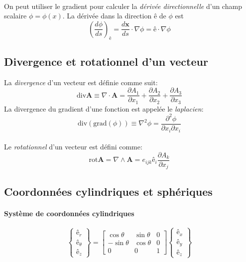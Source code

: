 \paragraph{}
On peut utiliser le gradient pour calculer la \emph{dérivée directionnelle} d'un champ scalaire $\phi=\phi(x)$. La dérivée dans la direction $\textbf{ê}$ de $\phi$ est $$\left(\frac{d\phi}{ds}\right)_{\textbf{ê}}=\frac{d\textbf{x}}{ds}\cdot\nabla\phi=\textbf{ê}\cdot\nabla\phi$$ 

\subsection{Divergence et rotationnel d'un vecteur}
La \emph{divergence} d'un vecteur est définie comme suit: $$\text{div}\textbf{A}\equiv \nabla\cdot\textbf{A}=\frac{\partial A_1}{\partial x_1}+\frac{\partial A_2}{\partial x_2}+\frac{\partial A_3}{\partial x_3}$$
La divergence du gradient d'une fonction est appelée le \emph{laplacien}: $$\text{div}(\text{grad}(\phi))\equiv \nabla^2\phi=\frac{\partial^2\phi}{\partial x_i\partial x_i}$$
\paragraph{}
Le \emph{rotationnel} d'un vecteur est défini comme:
$$\text{rot}\textbf{A}=\nabla\wedge\textbf{A}=e_{ijk}\textbf{ê}_i\frac{\partial A_k}{\partial x_j}$$

\subsection{Coordonnées cylindriques et sphériques}
\paragraph{Système de coordonnées cylindriques}
$$\left\{\begin{array}{c}
\textbf{ê}_r\\
\textbf{ê}_{\theta}\\
\textbf{ê}_z
\end{array}\right\}=
\left[\begin{array}{ccc}
\cos\theta&\sin\theta&0\\
-\sin\theta&\cos\theta&0\\
0&0&1
\end{array}\right]
\left\{\begin{array}{c}
\textbf{ê}_x\\
\textbf{ê}_y\\
\textbf{ê}_z
\end{array}\right\}$$

